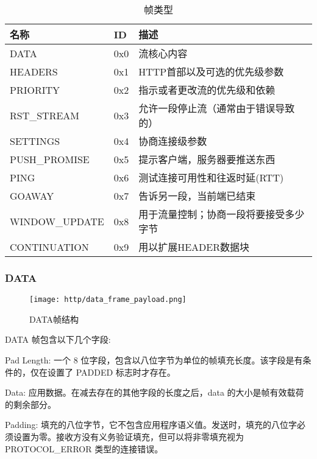 \begin{table}[H]
    \renewcommand{\arraystretch}{1.5}
    \centering
     \begin{tabular} {p{100pt}p{30pt}p{250pt}}
     \hline
    名称             & ID      &   描述                             \\ \hline
    DATA            & 0x0     &   流核心内容                          \\ \hline
    HEADERS         & 0x1     &  HTTP首部以及可选的优先级参数           \\ \hline
    PRIORITY        & 0x2     &  指示或者更改流的优先级和依赖           \\ \hline
    RST\_STREAM     & 0x3     &  允许一段停止流（通常由于错误导致的）     \\ \hline
    SETTINGS        & 0x4     &  协商连接级参数                       \\ \hline
    PUSH\_PROMISE   & 0x5     &  提示客户端，服务器要推送东西            \\ \hline
    PING            & 0x6     &  测试连接可用性和往返时延(RTT)           \\ \hline
    GOAWAY          & 0x7     &  告诉另一段，当前端已结束                \\ \hline
    WINDOW\_UPDATE  & 0x8     &  用于流量控制；协商一段将要接受多少字节     \\ \hline
    CONTINUATION    & 0x9     &  用以扩展HEADER数据块                   \\ \hline
    \end{tabular}
    \caption{\label{tab:table-name}帧类型}
    \end{table}


\subsubsection{DATA}

\begin{figure}[H]
    \centering
    \texttt{[image: http/data\_frame\_payload.png]}
    \caption{DATA帧结构}
\end{figure}

DATA 帧包含以下几个字段:

Pad Length:
一个 8 位字段，包含以八位字节为单位的帧填充长度。该字段是有条件的，仅在设置了 PADDED 标志时才存在。

Data:
应用数据。在减去存在的其他字段的长度之后，data 的大小是帧有效载荷的剩余部分。

Padding:
填充的八位字节，它不包含应用程序语义值。发送时，填充的八位字必须设置为零。接收方没有义务验证填充，但可以将非零填充视为 PROTOCOL\_ERROR 类型的连接错误。


